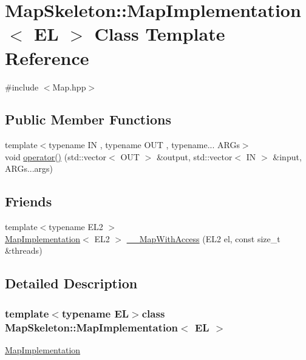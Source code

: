 \hypertarget{classMapSkeleton_1_1MapImplementation}{\section{Map\-Skeleton\-:\-:Map\-Implementation$<$ E\-L $>$ Class Template Reference}
\label{classMapSkeleton_1_1MapImplementation}
}


{\ttfamily \#include $<$Map.\-hpp$>$}

\subsection*{Public Member Functions}
\begin{DoxyCompactItemize}
\item 
{\footnotesize template$<$typename I\-N , typename O\-U\-T , typename... A\-R\-Gs$>$ }\\void \hyperlink{classMapSkeleton_1_1MapImplementation_ab62f221a4732934d7c4e094f64cfabe0}{operator()} (std\-::vector$<$ O\-U\-T $>$ \&output, std\-::vector$<$ I\-N $>$ \&input, A\-R\-Gs...\-args)
\end{DoxyCompactItemize}
\subsection*{Friends}
\begin{DoxyCompactItemize}
\item 
{\footnotesize template$<$typename E\-L2 $>$ }\\\hyperlink{classMapSkeleton_1_1MapImplementation}{Map\-Implementation}$<$ E\-L2 $>$ \hyperlink{classMapSkeleton_1_1MapImplementation_a1fbf2c81eaeb5d172db332750e595c0d}{\-\_\-\-\_\-\-Map\-With\-Access} (E\-L2 el, const size\-\_\-t \&threads)
\end{DoxyCompactItemize}


\subsection{Detailed Description}
\subsubsection*{template$<$typename E\-L$>$class Map\-Skeleton\-::\-Map\-Implementation$<$ E\-L $>$}

\hyperlink{classMapSkeleton_1_1MapImplementation}{Map\-Implementation} 

